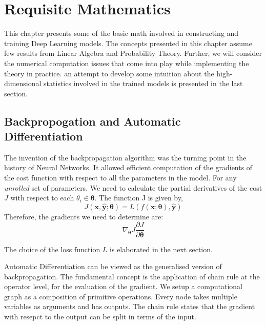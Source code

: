 
\chapter{Requisite Mathematics} %
\label{ch:math} %



This chapter presents some of the basic math involved in constructing and training Deep Learning models. The concepts presented in this chapter assume few results from Linear Algebra and Probability Theory.  Further, we will consider the numerical computation issues that come into play while implementing the theory in practice. an attempt to develop some intuition about the high-dimensional statistics involved in the trained models is presented in the last section.

\section{Backpropogation and Automatic Differentiation}
\label{sec:bpad}
The invention of the backpropagation algorithm was the turning point in the history of Neural Networks. It allowed efficient computation of the gradients of the cost function with respect to all the parameters in the model. For any \textit{unrolled} set of parameters. We need to calculate the partial derivatives of the cost $J$ with respect to each $\theta _{i} \in \bm{\theta}$. The function J is given by,
\begin{equation}
J(\bm{x},\bm{\hat{y}};\bm{\theta}) = L(f(\bm{x};\bm{\theta}), \bm{\hat{y}})
\end{equation}
Therefore, the gradients we need to determine are:
\begin{equation}
\nabla _{\bm{\theta }} J \frac{\partial J }{\partial \bm{ \theta }}
\end{equation}

The choice of the loss function $L$ is elaborated in the next section.

Automatic Differentiation can be viewed as the generalised version of backpropagation. The fundamental concept is the application of chain rule at the operator level, for the evaluation of the gradient. We setup a computational graph as a composition of primitive operations. Every node takes multiple variables as arguments and has outputs. The chain rule states that the gradient with resepct to the output can be split in terms of the input.

